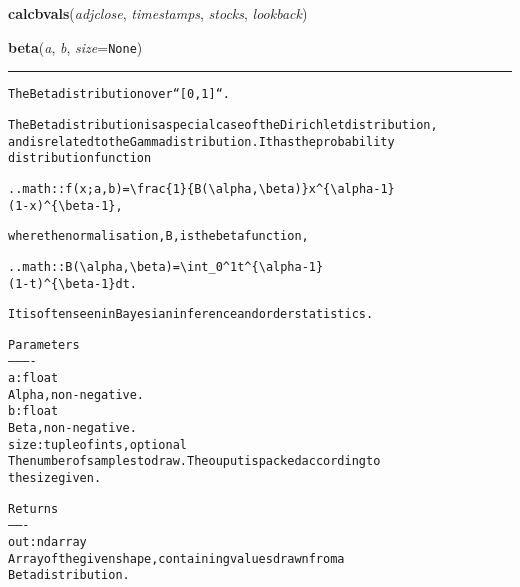     \label{QSTK:qstkutil:bollinger:calcbvals}

    \vspace{0.5ex}

\hspace{.8\funcindent}\begin{boxedminipage}{\funcwidth}

    \raggedright \textbf{calcbvals}(\textit{adjclose}, \textit{timestamps}, \textit{stocks}, \textit{lookback})

\setlength{\parskip}{2ex}
\setlength{\parskip}{1ex}
    \end{boxedminipage}

    \label{QSTK:qstklearn:mldiagnostics:beta}

    \vspace{0.5ex}

\hspace{.8\funcindent}\begin{boxedminipage}{\funcwidth}

    \raggedright \textbf{beta}(\textit{a}, \textit{b}, \textit{size}={\tt None})

    \vspace{-1.5ex}

    \rule{\textwidth}{0.5\fboxrule}
\setlength{\parskip}{2ex}
\begin{alltt}
The Beta distribution over ``[0, 1]``.

The Beta distribution is a special case of the Dirichlet distribution,
and is related to the Gamma distribution.  It has the probability
distribution function

.. math:: f(x; a,b) = {\textbackslash}frac\{1\}\{B({\textbackslash}alpha, {\textbackslash}beta)\} x{\textasciicircum}\{{\textbackslash}alpha - 1\}
                                                 (1 - x){\textasciicircum}\{{\textbackslash}beta - 1\},

where the normalisation, B, is the beta function,

.. math:: B({\textbackslash}alpha, {\textbackslash}beta) = {\textbackslash}int\_0{\textasciicircum}1 t{\textasciicircum}\{{\textbackslash}alpha - 1\}
                             (1 - t){\textasciicircum}\{{\textbackslash}beta - 1\} dt.

It is often seen in Bayesian inference and order statistics.

Parameters
----------
a : float
    Alpha, non-negative.
b : float
    Beta, non-negative.
size : tuple of ints, optional
    The number of samples to draw.  The ouput is packed according to
    the size given.

Returns
-------
out : ndarray
    Array of the given shape, containing values drawn from a
    Beta distribution.
\end{alltt}

\setlength{\parskip}{1ex}
    \end{boxedminipage}


